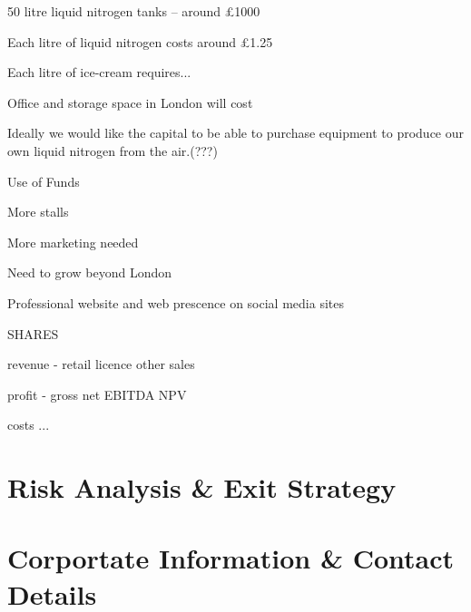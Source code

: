 \documentclass{article}
\begin{document}
50 litre liquid nitrogen tanks – around £1000

Each litre of liquid nitrogen costs around £1.25

Each litre of ice-cream requires...

Office and storage space in London will cost

Ideally we would like the capital to be able to purchase equipment to
produce our own liquid nitrogen from the air.(???)

Use of Funds

More stalls

More marketing needed

Need to grow beyond London

Professional website and web prescence on social media sites


SHARES



revenue
 - retail
   licence
   other sales

profit
 - gross
   net
   EBITDA
   NPV

costs
 ...

\section{Risk Analysis \& Exit Strategy}



\section{Corportate Information \& Contact Details}
\end{document}
